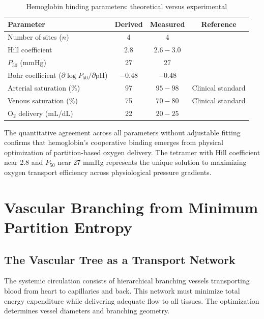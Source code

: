 \documentclass[10pt,twocolumn,a4paper]{article}
\theoremstyle{remark}
\begin{document}
\begin{table}[h]
\centering
\caption{Hemoglobin binding parameters: theoretical versus experimental}
\label{tab:hemoglobin_validation}
\begin{tabular}{lccc}
\toprule
\textbf{Parameter} & \textbf{Derived} & \textbf{Measured} & \textbf{Reference} \\
\midrule
Number of sites ($n$) & 4 & 4 & \cite{perutz1970stereochemistry} \\
Hill coefficient & 2.8 & $2.6-3.0$ & \cite{imai1982oxygen} \\
$P_{50}$ (mmHg) & 27 & 27 & \cite{severinghaus1979simple} \\
Bohr coefficient ($\partial \log P_{50}/\partial \mathrm{pH}$) & $-0.48$ & $-0.48$ & \cite{bohr1904haemoglobin} \\
Arterial saturation (\%) & 97 & $95-98$ & Clinical standard \\
Venous saturation (\%) & 75 & $70-80$ & Clinical standard \\
O$_{2}$ delivery (mL/dL) & 22 & $20-25$ & \cite{west2012respiratory} \\
\bottomrule
\end{tabular}
\end{table}

The quantitative agreement across all parameters without adjustable fitting confirms that hemoglobin's cooperative binding emerges from physical optimization of partition-based oxygen delivery. The tetramer with Hill coefficient near 2.8 and $P_{50}$ near 27 mmHg represents the unique solution to maximizing oxygen transport efficiency across physiological pressure gradients.

\section{Vascular Branching from Minimum Partition Entropy}
\label{sec:vascular}

\subsection{The Vascular Tree as a Transport Network}

The systemic circulation consists of hierarchical branching vessels transporting blood from heart to capillaries and back. This network must minimize total energy expenditure while delivering adequate flow to all tissues. The optimization determines vessel diameters and branching geometry.
\end{document}
